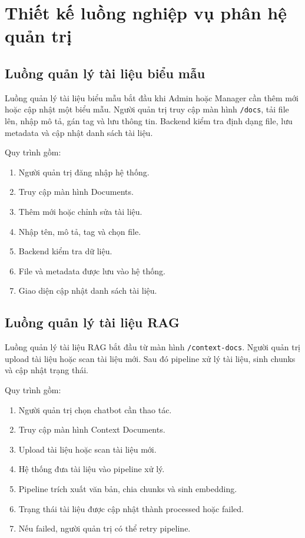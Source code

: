 \section{Thiết kế luồng nghiệp vụ phân hệ quản trị}

\subsection{Luồng quản lý tài liệu biểu mẫu}

Luồng quản lý tài liệu biểu mẫu bắt đầu khi Admin hoặc Manager cần thêm mới hoặc cập nhật một biểu mẫu. Người quản trị truy cập màn hình \texttt{/docs}, tải file lên, nhập mô tả, gán tag và lưu thông tin. Backend kiểm tra định dạng file, lưu metadata và cập nhật danh sách tài liệu.

Quy trình gồm:

\begin{enumerate}
    \item Người quản trị đăng nhập hệ thống.
    \item Truy cập màn hình Documents.
    \item Thêm mới hoặc chỉnh sửa tài liệu.
    \item Nhập tên, mô tả, tag và chọn file.
    \item Backend kiểm tra dữ liệu.
    \item File và metadata được lưu vào hệ thống.
    \item Giao diện cập nhật danh sách tài liệu.
\end{enumerate}

\subsection{Luồng quản lý tài liệu RAG}

Luồng quản lý tài liệu RAG bắt đầu từ màn hình \texttt{/context-docs}. Người quản trị upload tài liệu hoặc scan tài liệu mới. Sau đó pipeline xử lý tài liệu, sinh chunks và cập nhật trạng thái.

Quy trình gồm:

\begin{enumerate}
    \item Người quản trị chọn chatbot cần thao tác.
    \item Truy cập màn hình Context Documents.
    \item Upload tài liệu hoặc scan tài liệu mới.
    \item Hệ thống đưa tài liệu vào pipeline xử lý.
    \item Pipeline trích xuất văn bản, chia chunks và sinh embedding.
    \item Trạng thái tài liệu được cập nhật thành processed hoặc failed.
    \item Nếu failed, người quản trị có thể retry pipeline.
\end{enumerate}

